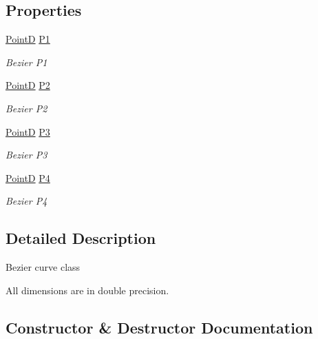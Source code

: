 \subsection*{Properties}
\begin{DoxyCompactItemize}
\item 
\hyperlink{class_pdf_file_writer_1_1_point_d}{PointD} \hyperlink{class_pdf_file_writer_1_1_bezier_d_a28c51951f0b0103c5fe4fc41aef00d1f}{P1}
\begin{DoxyCompactList}\small\item\em Bezier P1 \end{DoxyCompactList}\item 
\hyperlink{class_pdf_file_writer_1_1_point_d}{PointD} \hyperlink{class_pdf_file_writer_1_1_bezier_d_a57c96ae6696f9c6c37536049299a65f5}{P2}
\begin{DoxyCompactList}\small\item\em Bezier P2 \end{DoxyCompactList}\item 
\hyperlink{class_pdf_file_writer_1_1_point_d}{PointD} \hyperlink{class_pdf_file_writer_1_1_bezier_d_a46c2ce81205a167e07de37b604190ac7}{P3}
\begin{DoxyCompactList}\small\item\em Bezier P3 \end{DoxyCompactList}\item 
\hyperlink{class_pdf_file_writer_1_1_point_d}{PointD} \hyperlink{class_pdf_file_writer_1_1_bezier_d_a7e4ba1d387a6f241715c69a5ca78e574}{P4}
\begin{DoxyCompactList}\small\item\em Bezier P4 \end{DoxyCompactList}\end{DoxyCompactItemize}


\subsection{Detailed Description}
Bezier curve class 

All dimensions are in double precision. 

\subsection{Constructor \& Destructor Documentation}
